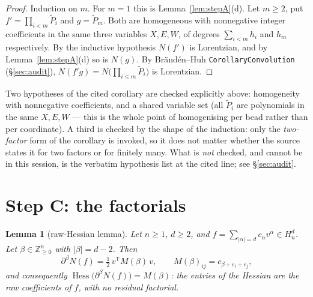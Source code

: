 \documentclass[11pt]{article}
\theoremstyle{plain}
\newtheorem{lemma}[theorem]{Lemma}
\theoremstyle{definition}
\DeclareMathOperator{\Hess}{Hess}
\newcommand{\Z}{\mathbb{Z}}
\newcommand{\Pt}{\widetilde P}
\begin{document}
\begin{proof}
Induction on $m$. For $m=1$ this is Lemma~\ref{lem:stepA}(d). Let $m\ge2$, put
$f'=\prod_{i<m}\Pt_i$ and $g=\Pt_m$. Both are homogeneous with nonnegative integer
coefficients in the same three variables $X,E,W$, of degrees $\sum_{i<m}h_i$ and $h_m$
respectively. By the inductive hypothesis $N(f')$ is Lorentzian, and by
Lemma~\ref{lem:stepA}(d) so is $N(g)$. By Brändén--Huh \texttt{CorollaryConvolution}
(\S\ref{sec:audit}), $N(f'g)=N\bigl(\prod_{i\le m}\Pt_i\bigr)$ is Lorentzian.
\end{proof}

Two hypotheses of the cited corollary are checked explicitly above: homogeneity with
nonnegative coefficients, and a shared variable set (all $\Pt_i$ are polynomials in the
same $X,E,W$ --- this is the whole point of homogenising per bead rather than per
coordinate). A third is checked by the shape of the induction: only the \emph{two-factor}
form of the corollary is invoked, so it does not matter whether the source states it for
two factors or for finitely many. What is \emph{not} checked, and cannot be in this
session, is the verbatim hypothesis list at the cited line; see \S\ref{sec:audit}.

\section{Step C: the factorials}

\begin{lemma}[raw-Hessian lemma]\label{lem:rawhess}
Let $n\ge1$, $d\ge2$, and $f=\sum_{|\alpha|=d}c_\alpha v^\alpha\in H^d_n$. Let
$\beta\in\Z_{\ge0}^n$ with $|\beta|=d-2$. Then
\[
  \partial^\beta N(f)=\tfrac12\,v^{\mathsf T}M(\beta)\,v,\qquad
  M(\beta)_{ij}=c_{\beta+e_i+e_j},
\]
and consequently $\Hess\bigl(\partial^\beta N(f)\bigr)=M(\beta)$: the entries of the
Hessian are the \emph{raw} coefficients of $f$, with no residual factorial.
\end{lemma}
\end{document}
